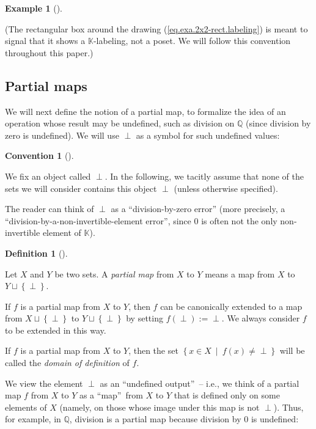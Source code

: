 \documentclass[numbers=enddot,12pt,final,onecolumn,notitlepage]{scrartcl}%
\theoremstyle{definition}
\newtheorem{defi}[theo]{Definition}
\newenvironment{definition}[1][]
{\begin{defi}[#1]\begin{leftbar}}
{\end{leftbar}\end{defi}}
\newtheorem{conv}[theo]{Convention}
\newenvironment{convention}[1][]
{\begin{conv}[#1]\begin{leftbar}}
{\end{leftbar}\end{conv}}
\newtheorem{exam}[theo]{Example}
\newenvironment{example}[1][]
{\begin{exam}[#1]\begin{leftbar}}
{\end{leftbar}\end{exam}}
\newenvironment{verlong}{}{}
\newcommand{\undf}{\operatorname*{\bot}}
\begin{document}
\begin{example}
\begin{verlong}
(The rectangular box around the drawing (\ref{eq.exa.2x2-rect.labeling}) is
meant to signal that it shows a $\mathbb{K}$-labeling, not a poset. We will
follow this convention throughout this paper.)
\end{verlong}
\end{example}

\subsection{Partial maps}

We will next define the notion of a partial map, to formalize the idea of an
operation whose result may be undefined, such as division on $\mathbb{Q}$
(since division by zero is undefined). We will use $\undf$ as a symbol for
such undefined values:

\begin{convention}
We fix an object called $\undf$. In the following, we tacitly assume that none
of the sets we will consider contains this object $\undf$ (unless otherwise specified).
\end{convention}

The reader can think of $\undf$ as a ``division-by-zero error'' (more
precisely, a ``division-by-a-non-invertible-element error'', since $0$ is
often not the only non-invertible element of $\mathbb{K}$).



\begin{definition}
Let $X$ and $Y$ be two sets. A \emph{partial map} from $X$ to $Y$ means a map
from $X$ to $Y\sqcup\left\{  \undf\right\}  $.

If $f$ is a partial map from $X$ to $Y$, then $f$ can be canonically extended
to a map from $X\sqcup\left\{  \undf\right\}  $ to $Y\sqcup\left\{
\undf\right\}  $ by setting $f\left(  \undf\right)  :=\undf$. We always
consider $f$ to be extended in this way.

If $f$ is a partial map from $X$ to $Y$, then the set $\left\{  x\in
X\ \mid\ f\left(  x\right)  \neq\undf\right\}  $ will be called the
\emph{domain of definition} of $f$.
\end{definition}

We view the element $\undf$ as an \textquotedblleft undefined
output\textquotedblright\ -- i.e., we think of a partial map $f$ from $X$ to
$Y$ as a \textquotedblleft map\textquotedblright\ from $X$ to $Y$ that is
defined only on some elements of $X$ (namely, on those whose image under this
map is not $\undf$). Thus, for example, in $\mathbb{Q}$, division is a partial
map because division by $0$ is undefined:
\end{document}
